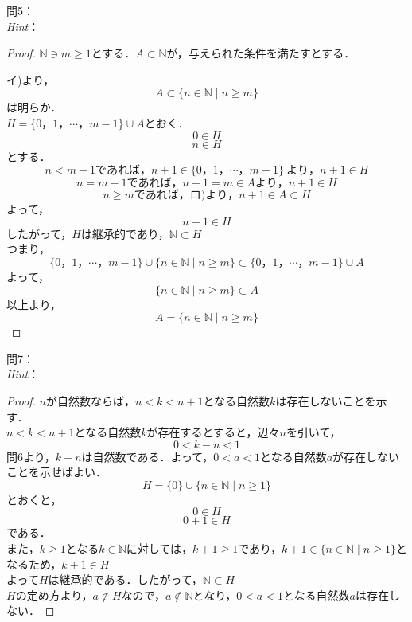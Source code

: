 \documentclass[dvipdfmx,uplatex,11pt]{jsarticle}
\theoremstyle{definition}
\begin{document}
%
\newpage
%
\setcounter{equation}{0}
\noindent
問5：
\\
\textsl{Hint}：\\
\dotfill
%
% 
%
\begin{leftbar}
	\begin{proof}
		$\mathbb{N} \ni m \ge 1$とする．$A \subset \mathbb{N}$が，与えられた条件を満たすとする．\par
		イ)より，
		\[ A \subset \{n \in \mathbb{N} \mid n \ge m\} \]
		は明らか．\\
		$H=\{0，1，\cdots，m-1\} \cup A$とおく．
		\begin{equation}
			0 \in H
		\end{equation}
		\begin{equation}
			n \in H
		\end{equation}
		とする．\\
		\[ n<m-1であれば，n+1 \in \{0，1，\cdots，m-1\}~より，n+1 \in H \]
		\[ n=m-1であれば，n+1=m \in Aより，n+1 \in H\]
		\[ n \ge mであれば，ロ)より，n+1 \in A \subset H \]
		よって，
		\[
			n+1 \in H
		\]
		したがって，$H$は継承的であり，$\mathbb{N} \subset H$\\
		つまり，\\
		\[
			\{0，1，\cdots，m-1\} \cup \{n \in \mathbb{N} \mid n \ge m \} \subset \{0，1，\cdots，m-1\} \cup A
		\]
		よって，
		\[
			\{n \in \mathbb{N}\mid n \ge m \} \subset A
		\]
		以上より，
		\[
			A=\{n \in \mathbb{N} \mid n \ge m\}
		\]
	\end{proof}
\end{leftbar}
%
\newpage
%
\noindent
問7：
\\
\textsl{Hint}：\\
\dotfill
%
\begin{leftbar}
	\begin{proof}
		$n$が自然数ならば，$n <k <n+1$となる自然数$k$は存在しないことを示す．\\
		$n < k < n+1$となる自然数$k$が存在するとすると，辺々$n$を引いて，
		\[ 0 < k - n < 1 \]
		問6より，$k-n$は自然数である．よって，$0<a<1$となる自然数$a$が存在しないことを示せばよい．\\
		\[ H=\{0\} \cup \{n \in \mathbb{N} \mid n \ge 1 \} \]
		とおくと，
		\begin{equation}
			0 \in H
		\end{equation}
		\begin{equation}
			0+1 \in H
		\end{equation}
		である．\\
		また，$k \ge 1$となる$k \in \mathbb{N}$に対しては，$k +1 \ge 1$であり，$k+1 \in \{n \in \mathbb{N} \mid n \ge 1 \} $となるため，$k+1 \in H$\\
		よって$H$は継承的である．したがって，$\mathbb{N} \subset H$\\
		$H$の定め方より，$a \notin H$なので，$a \notin \mathbb{N}$となり，$0<a<1$となる自然数$a$は存在しない．
	\end{proof}
\end{leftbar}
%
\newpage
%
\setcounter{equation}{0}
\end{document}
